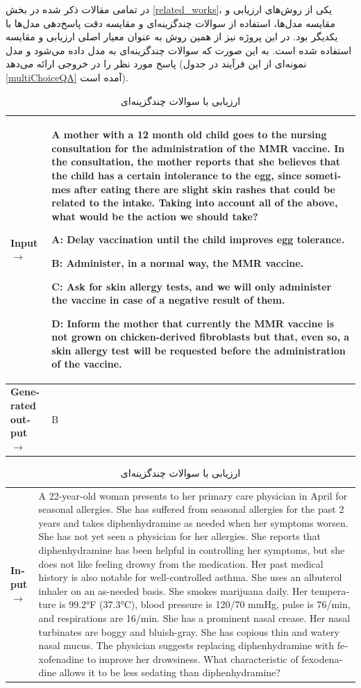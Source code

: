 \documentclass[11pt, a4paper, oneside]{book}
\begin{document}
				در تمامی مقالات ذکر شده در بخش \ref{related_works}، یکی از روش‌های ارزیابی و مقایسه مدل‌ها، استفاده از سوالات چندگزینه‌ای و مقایسه دقت پاسخ‌دهی مدل‌ها با یکدیگر بود. در این پروژه نیز از همین روش به عنوان معیار اصلی ارزیابی و مقایسه استفاده شده است. به این صورت که سوالات چندگزینه‌ای به مدل داده می‌شود و مدل پاسخ مورد نظر را در خروجی ارائه می‌دهد (نمونه‌ای از این فرآیند در جدول \ref{multiChoiceQA} آمده است). \cite{eval-harness}
				
				
				\begin{table}[ht]
					\centering
					\caption{ارزیابی با سوالات چندگزینه‌ای}
					\begin{latin}
						\begin{tabular}{|l|p{8cm}|}
							\hline
							\textbf{Input} $\rightarrow$ & A mother with a 12 month old child goes to the nursing consultation for the administration of the MMR vaccine. In the consultation, the mother reports that she believes that the child has a certain intolerance to the egg, since sometimes after eating there are slight skin rashes that could be related to the intake. Taking into account all of the above, what would be the action we should take?
							
							A: Delay vaccination until the child improves egg tolerance.
							
							B: Administer, in a normal way, the MMR vaccine.
							
							C: Ask for skin allergy tests, and we will only administer the vaccine in case of a negative result of them.
							
							D:‌ Inform the mother that currently the MMR vaccine is not grown on chicken-derived fibroblasts but that, even so, a skin allergy test will be requested before the administration of the vaccine. \\
							\hline
							\textbf{Generated output} $\rightarrow$ & B \\
							\hline
							\hline
						\end{tabular}
						
						
						\begin{tabular}{|l|p{8cm}|}
							\hline
							\textbf{Input} $\rightarrow$ & 	
							A 22-year-old woman presents to her primary care physician in April for seasonal allergies. She has suffered from seasonal allergies for the past 2 years and takes diphenhydramine as needed when her symptoms worsen. She has not yet seen a physician for her allergies. She reports that diphenhydramine has been helpful in controlling her symptoms, but she does not like feeling drowsy from the medication. Her past medical history is also notable for well-controlled asthma. She uses an albuterol inhaler on an as-needed basis. She smokes marijuana daily. Her temperature is 99.2°F (37.3°C), blood pressure is 120/70 mmHg, pulse is 76/min, and respirations are 16/min. She has a prominent nasal crease. Her nasal turbinates are boggy and bluish-gray. She has copious thin and watery nasal mucus. The physician suggests replacing diphenhydramine with fexofenadine to improve her drowsiness. What characteristic of fexodenadine allows it to be less sedating than diphenhydramine?
							

\end{tabular}
\end{latin}
\end{table}
\end{document}
